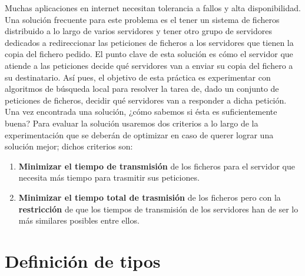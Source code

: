 \documentclass[a4paper,10pt]{report}
\begin{document}
        Muchas aplicaciones en internet necesitan tolerancia a fallos y alta disponibilidad. Una solución frecuente para este problema es el tener un sistema de ficheros distribuido a lo largo de varios servidores y tener otro grupo de servidores dedicados a redireccionar las peticiones de ficheros a los servidores que tienen la copia del fichero pedido.\newline\newline
        El punto clave de esta solución es cómo el servidor que atiende a las peticiones decide qué servidores van a enviar su copia del fichero a su destinatario. Así pues, el objetivo de esta práctica es experimentar con algoritmos de búsqueda local para resolver la tarea de, dado un conjunto de peticiones de ficheros, decidir qué servidores van a responder a dicha petición.\newline\newline
        Una vez encontrada una solución, ¿cómo sabemos si ésta es suficientemente buena? Para evaluar la solución usaremos dos criterios a lo largo de la experimentación que se deberán de optimizar en caso de querer lograr una solución mejor; dichos criterios son:
        \begin{enumerate}
            \item \textbf{Minimizar el tiempo de transmisión} de los ficheros para el servidor que necesita más tiempo para trasmitir sus peticiones.
            \item \textbf{Minimizar el tiempo total de trasmisión} de los ficheros pero con la \textbf{restricción} de que los tiempos de transmisión de los servidores han de ser lo más similares posibles entre ellos.
        \end{enumerate}
        
    \section*{Definición de tipos }
    
\end{document}
